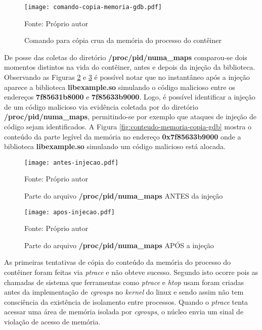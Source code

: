 \begin{figure}[htb!]
\footnotesize
\caption{Comando para cópia crua da memória do processo do contêiner}
\texttt{[image: comando-copia-memoria-gdb.pdf]}
\centering
\label{fig:comando-copia}
\begin{center}
Fonte: Próprio autor 
\end{center}
\end{figure}

%
De posse das coletas do diretório \textbf{/proc/pid/numa\_maps} comparou-se dois momentos distintos na vida do contêiner, antes e depois da injeção da biblioteca.
%
Observando as Figuras \ref{fig:antes-injecao} e \ref{fig:apos-injecao} é possível notar que no instantâneo após a injeção aparece a biblioteca \textbf{libexample.so} simulando o código malicioso entre os endereços \textbf{7f85631b8000} e \textbf{7f85633b9000}.
%
Logo, é possível identificar a injeção de um código malicioso via evidência coletada por \fancyname do diretório \textbf{/proc/pid/numa\_maps}, permitindo-se por exemplo que ataques de injeção de código sejam identificados.
%
A Figura \ref{fig:conteudo-memoria-copia-gdb} mostra o conteúdo da parte legível da memória no endereço \textbf{0x7f85633b9000} onde a biblioteca \textbf{libexample.so} simulando um código malicioso está alocada.

\begin{figure}[htb!]
\footnotesize
\caption{Parte do arquivo \textbf{/proc/pid/numa\_maps} ANTES da injeção }
\texttt{[image: antes-injecao.pdf]}
\centering
\label{fig:antes-injecao}
\begin{center}
Fonte: Próprio autor 
\end{center}
\end{figure}


\begin{figure}[htb!]
\footnotesize
\caption{Parte do arquivo \textbf{/proc/pid/numa\_maps} APÓS a injeção }
\texttt{[image: apos-injecao.pdf]}
\centering
\label{fig:apos-injecao}
\begin{center}
Fonte: Próprio autor 
\end{center}
\end{figure}

%
As primeiras tentativas de cópia do conteúdo da memória do processo do contêiner foram feitas via \textit{ptrace} e não obteve sucesso. 
%
Segundo \cite{cgroupsxptrace} isto ocorre pois as chamadas de sistema que ferramentas como \textit{ptrace} e \textit{htop} usam foram criadas antes da implementação de \textit{cgroups} no \textit{kernel} do linux e sendo assim não tem consciência da existência de isolamento entre processos.
%
Quando o \textit{ptrace} tenta acessar uma área de memória isolada por \textit{cgroups}, o núcleo envia um sinal de violação de acesso de memória.%
%

